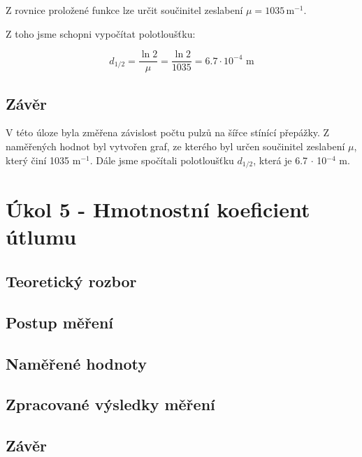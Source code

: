 \documentclass{protokol}
\begin{document}
    
    \begin{flushleft}
    Z rovnice proložené funkce lze určit součinitel zeslabení $\mu = 1035 \, \text{m}^{-1}$.
    \end{flushleft}
    
    \begin{flushleft}
        Z toho jsme schopni vypočítat polotloušťku:
    \end{flushleft}

        \begin{equation}
        d_{1/2} =  \dfrac{\ln{2}}{\mu} = \dfrac{\ln{2}}{1035} = 6.7 \cdot 10^{-4} \text{ m}
        \end{equation}
    


    \subsection{Závěr}

    V této úloze byla změřena závislost počtu pulzů na šířce stínící přepážky. Z naměřených hodnot byl vytvořen graf, ze kterého byl určen součinitel zeslabení $\mu$, který činí 1035 m$^{-1}$. Dále jsme spočítali polotloušťku $d_{1/2}$, která je 6.7 $\cdot$ 10$^{-4}$ m.

\pagebreak

\section{Úkol 5 - Hmotnostní koeficient útlumu}
    \subsection{Teoretický rozbor}
    \subsection{Postup měření}
    \subsection{Naměřené hodnoty}   
    \subsection{Zpracované výsledky měření}
    \subsection{Závěr}
\end{document}
